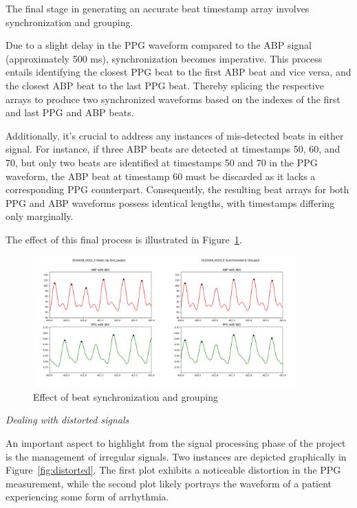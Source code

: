 The final stage in generating an accurate beat timestamp array involves synchronization and grouping.

Due to a slight delay in the PPG waveform compared to the ABP signal (approximately 500 ms), synchronization becomes imperative.
This process entails identifying the closest PPG beat to the first ABP beat and vice versa, and the closest ABP beat to the last PPG beat.
Thereby splicing the respective arrays to produce two synchronized waveforms based on the indexes of the first and last PPG and ABP beats.

Additionally, it's crucial to address any instances of mis-detected beats in either signal.
For instance, if three ABP beats are detected at timestamps 50, 60, and 70, but only two beats are identified at timestamps 50 and 70 in the PPG waveform,
the ABP beat at timestamp 60 must be discarded as it lacks a corresponding PPG counterpart.
Consequently, the resulting beat arrays for both PPG and ABP waveforms possess identical lengths, with timestamps differing only marginally.

The effect of this final process is illustrated in Figure~\ref{fig:synchronized}.

\begin{figure}[h]
    \includegraphics[width=0.9\textwidth]{images/methods/synchronised}
    \caption{Effect of beat synchronization and grouping}
    \label{fig:synchronized}
\end{figure}

\vspace{0.2cm}
\textit{Dealing with distorted signals}
\vspace{0.2cm}

An important aspect to highlight from the signal processing phase of the project is the management of irregular signals.
Two instances are depicted graphically in Figure~\ref{fig:distorted}.
The first plot exhibits a noticeable distortion in the PPG measurement, while the second plot likely portrays the waveform of a patient experiencing some form of arrhythmia.

